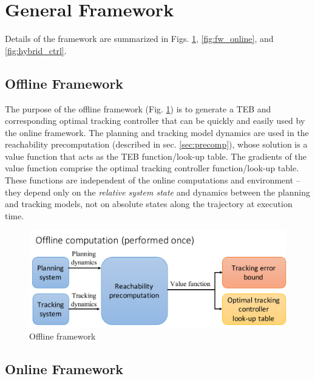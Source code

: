 \section{General Framework \label{sec:framework}}
Details of the framework are summarized in Figs. \ref{fig:fw_offline}, \ref{fig:fw_online}, and \ref{fig:hybrid_ctrl}. 
\subsection{Offline Framework}
The purpose of the offline framework (Fig. \ref{fig:fw_offline}) is to generate a TEB and corresponding optimal tracking controller that can be quickly and easily used by the online framework.
The planning and tracking model dynamics are used in the reachability precomputation (described in sec. \ref{sec:precomp}), whose solution is a value function that acts as the TEB function/look-up table. 
The gradients of the value function comprise the optimal tracking controller function/look-up table. 
These functions are independent of the online computations and environment -- they depend only on the \textit{relative system state} and dynamics between the planning and tracking models, not on absolute states along the trajectory at execution time.

\begin{figure}[h!]
	\centering
	\includegraphics[width=0.9\columnwidth]{fig/framework_offline}
	\caption{Offline framework}
	\label{fig:fw_offline}
\end{figure}

\subsection{Online Framework}

